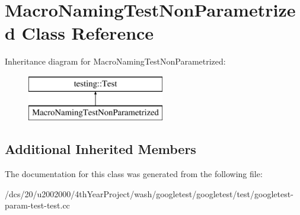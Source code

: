 \hypertarget{classMacroNamingTestNonParametrized}{}\section{Macro\+Naming\+Test\+Non\+Parametrized Class Reference}
\label{classMacroNamingTestNonParametrized}
Inheritance diagram for Macro\+Naming\+Test\+Non\+Parametrized\+:\begin{figure}[H]
\begin{center}
\leavevmode
\includegraphics[height=2.000000cm]{classMacroNamingTestNonParametrized}
\end{center}
\end{figure}
\subsection*{Additional Inherited Members}


The documentation for this class was generated from the following file\+:\begin{DoxyCompactItemize}
\item 
/dcs/20/u2002000/4th\+Year\+Project/wash/googletest/googletest/test/googletest-\/param-\/test-\/test.\+cc\end{DoxyCompactItemize}
